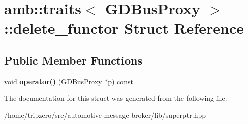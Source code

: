 \hypertarget{structamb_1_1traits_3_01GDBusProxy_01_4_1_1delete__functor}{\section{amb\-:\-:traits$<$ G\-D\-Bus\-Proxy $>$\-:\-:delete\-\_\-functor Struct Reference}
\label{structamb_1_1traits_3_01GDBusProxy_01_4_1_1delete__functor}
}
\subsection*{Public Member Functions}
\begin{DoxyCompactItemize}
\item 
\hypertarget{structamb_1_1traits_3_01GDBusProxy_01_4_1_1delete__functor_aa6bea2fb8b4ddb29378fa0188652b8da}{void {\bfseries operator()} (G\-D\-Bus\-Proxy $\ast$p) const }\label{structamb_1_1traits_3_01GDBusProxy_01_4_1_1delete__functor_aa6bea2fb8b4ddb29378fa0188652b8da}

\end{DoxyCompactItemize}


The documentation for this struct was generated from the following file\-:\begin{DoxyCompactItemize}
\item 
/home/tripzero/src/automotive-\/message-\/broker/lib/superptr.\-hpp\end{DoxyCompactItemize}
